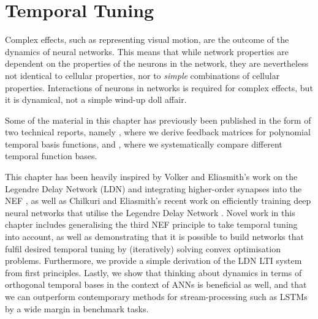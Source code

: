 \chapter{Temporal Tuning}
\label{chp:temporal_tuning}

\vspace{20pt}

\begin{OpeningQuote}
Complex effects, such as representing visual motion, are the outcome of the dynamics of neural networks. This means that while network properties are dependent on the properties of the neurons in the network, they are nevertheless not identical to cellular properties, nor to \emph{simple} combinations of cellular properties. Interactions of neurons in networks is required for complex effects, but it is dynamical, not a simple wind-up doll affair.
\end{OpeningQuote}

\begin{PriorPublication}
Some of the material in this chapter has previously been published in the form of two technical reports, namely \citet{stockel2021constructing}, where we derive feedback matrices for polynomial temporal basis functions, and \citet{stockel2021discrete}, where we systematically compare different temporal function bases.
\end{PriorPublication}

\begin{Contributions}
This chapter has been heavily inspired by Volker and Eliasmith's work on the Legendre Delay Network (LDN) and integrating higher-order synapses into the NEF \citep{voelker2018improving,voelker2019}, as well as Chilkuri and Eliasmith's recent work on efficiently training deep neural networks that utilise the Legendre Delay Network \citep{chilkuri2021parallelizing}.
Novel work in this chapter includes generalising the third NEF principle to take temporal tuning into account, as well as demonstrating that it is possible to build networks that fulfil desired temporal tuning by (iteratively) solving convex optimisation problems.
Furthermore, we provide a simple derivation of the LDN LTI system from first principles.
Lastly, we show that thinking about dynamics in terms of orthogonal temporal bases in the context of ANNs is beneficial as well, and that we can outperform contemporary methods for stream-processing such as LSTMs by a wide margin in benchmark tasks.
\end{Contributions}

